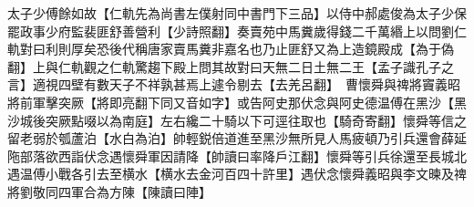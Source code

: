 太子少傅餘如故【仁軌先為尚書左僕射同中書門下三品】以侍中郝處俊為太子少保罷政事少府監裴匪舒善營利【少詩照翻】奏賣苑中馬糞歲得錢二千萬緡上以問劉仁軌對曰利則厚矣恐後代稱唐家賣馬糞非嘉名也乃止匪舒又為上造鏡殿成【為于偽翻】上與仁軌觀之仁軌驚趨下殿上問其故對曰天無二日土無二王【孟子識孔子之言】適視四壁有數天子不祥孰甚焉上遽令剔去【去羌呂翻】　曹懷舜與禆將竇義昭將前軍擊突厥【將即亮翻下同又音如字】或告阿史那伏念與阿史德温傅在黑沙【黑沙城後突厥點啜以為南庭】左右纔二十騎以下可逕往取也【騎奇寄翻】懷舜等信之留老弱於瓠蘆泊【水白為泊】帥輕鋭倍道進至黑沙無所見人馬疲頓乃引兵還會薛延陁部落欲西詣伏念遇懷舜軍因請降【帥讀曰率降戶江翻】懷舜等引兵徐還至長城北遇温傅小戰各引去至横水【横水去金河百四十許里】遇伏念懷舜義昭與李文暕及禆將劉敬同四軍合為方陳【陳讀曰陣】